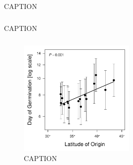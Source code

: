 \documentclass[11pt, oneside]{article}\usepackage[]{graphicx}\usepackage[]{color}
\begin{document}
\begin{table}[htbp]
	\fontsize{10}{12}
	\selectfont
	\caption[ANOVA table, leaf expansion rate]{CAPTION}
	\begin{center}
	\begin{tabular}{lcccccc}
	\toprule

	

	\bottomrule
	\end{tabular}
	\end{center}
\end{table}

\begin{table}[htbp]
	\fontsize{10}{12}
	\selectfont
	\caption[ANOVA table, stem expansion rate]{CAPTION}
	\begin{center}
	\begin{tabular}{lcccccc}
	\toprule

	

	\bottomrule
	\end{tabular}
	\end{center}
\end{table}


\begin{figure}[h!]
	\centerline{\includegraphics[width=0.5\textwidth]{Figures/Figure_DoG_Lat.pdf}}
	\fontsize{10}{12}
	\selectfont
	\caption[Southern populations germinate sooner.]{CAPTION}
	\label{fig:Fig_DoG}
\end{figure}
\end{document}
